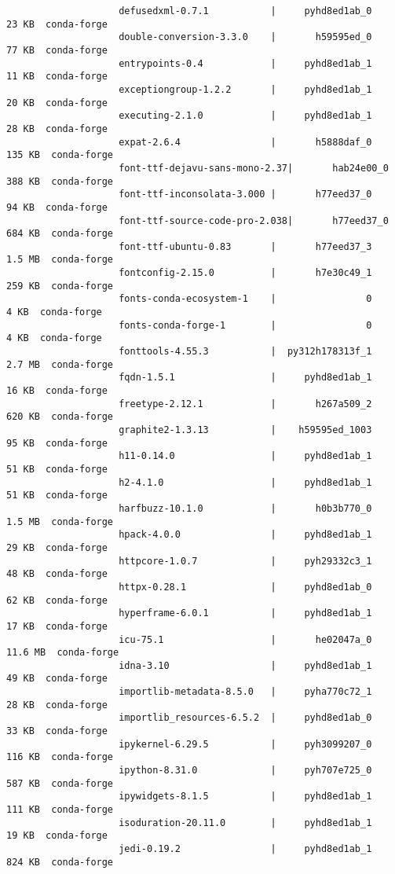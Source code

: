 \documentclass{article}
\begin{document}
\begin{enumerate}
\begin{itemize}
\begin{itemize}
\begin{itemize}
\begin{verbatim}
					defusedxml-0.7.1           |     pyhd8ed1ab_0          23 KB  conda-forge
					double-conversion-3.3.0    |       h59595ed_0          77 KB  conda-forge
					entrypoints-0.4            |     pyhd8ed1ab_1          11 KB  conda-forge
					exceptiongroup-1.2.2       |     pyhd8ed1ab_1          20 KB  conda-forge
					executing-2.1.0            |     pyhd8ed1ab_1          28 KB  conda-forge
					expat-2.6.4                |       h5888daf_0         135 KB  conda-forge
					font-ttf-dejavu-sans-mono-2.37|       hab24e00_0         388 KB  conda-forge
					font-ttf-inconsolata-3.000 |       h77eed37_0          94 KB  conda-forge
					font-ttf-source-code-pro-2.038|       h77eed37_0         684 KB  conda-forge
					font-ttf-ubuntu-0.83       |       h77eed37_3         1.5 MB  conda-forge
					fontconfig-2.15.0          |       h7e30c49_1         259 KB  conda-forge
					fonts-conda-ecosystem-1    |                0           4 KB  conda-forge
					fonts-conda-forge-1        |                0           4 KB  conda-forge
					fonttools-4.55.3           |  py312h178313f_1         2.7 MB  conda-forge
					fqdn-1.5.1                 |     pyhd8ed1ab_1          16 KB  conda-forge
					freetype-2.12.1            |       h267a509_2         620 KB  conda-forge
					graphite2-1.3.13           |    h59595ed_1003          95 KB  conda-forge
					h11-0.14.0                 |     pyhd8ed1ab_1          51 KB  conda-forge
					h2-4.1.0                   |     pyhd8ed1ab_1          51 KB  conda-forge
					harfbuzz-10.1.0            |       h0b3b770_0         1.5 MB  conda-forge
					hpack-4.0.0                |     pyhd8ed1ab_1          29 KB  conda-forge
					httpcore-1.0.7             |     pyh29332c3_1          48 KB  conda-forge
					httpx-0.28.1               |     pyhd8ed1ab_0          62 KB  conda-forge
					hyperframe-6.0.1           |     pyhd8ed1ab_1          17 KB  conda-forge
					icu-75.1                   |       he02047a_0        11.6 MB  conda-forge
					idna-3.10                  |     pyhd8ed1ab_1          49 KB  conda-forge
					importlib-metadata-8.5.0   |     pyha770c72_1          28 KB  conda-forge
					importlib_resources-6.5.2  |     pyhd8ed1ab_0          33 KB  conda-forge
					ipykernel-6.29.5           |     pyh3099207_0         116 KB  conda-forge
					ipython-8.31.0             |     pyh707e725_0         587 KB  conda-forge
					ipywidgets-8.1.5           |     pyhd8ed1ab_1         111 KB  conda-forge
					isoduration-20.11.0        |     pyhd8ed1ab_1          19 KB  conda-forge
					jedi-0.19.2                |     pyhd8ed1ab_1         824 KB  conda-forge

\end{verbatim}
\end{itemize}
\end{itemize}
\end{itemize}
\end{enumerate}
\end{document}
